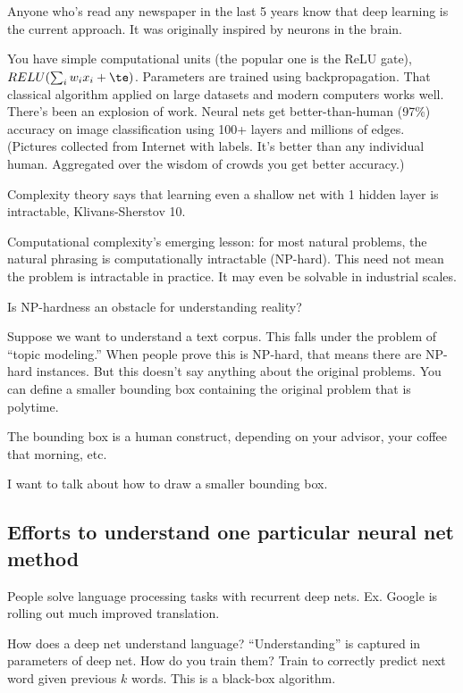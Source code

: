 Anyone who's read any newspaper in the last 5 years know that deep learning is the current approach. It was originally inspired by neurons in the brain.

You have simple computational units (the popular one is the ReLU gate), $RELU(\sum_i w_i x_i+\te)$.  
Parameters are trained using backpropagation. That classical algorithm applied on large datasets and modern computers works well. There's been an explosion of work. Neural nets get better-than-human (97\%) accuracy on image classification using 100+ layers and millions of edges. (Pictures collected from Internet with labels. It's better than any individual human. Aggregated over the wisdom of crowds you get better accuracy.)


Complexity theory says that learning even a shallow net with 1 hidden layer is intractable, Klivans-Sherstov 10.


Computational complexity's emerging lesson: for most natural problems, the natural phrasing is computationally intractable (NP-hard).
This need not mean the problem is intractable in practice. It may even be solvable in industrial scales.

Is NP-hardness an obstacle for understanding reality? 

Suppose we want to understand a text corpus. This falls under the problem of ``topic modeling.'' When people prove this is NP-hard, that means there are NP-hard instances. But this doesn't say anything about the original problems. You can define a smaller bounding box containing the original problem that is polytime.

The bounding box is a human construct, depending on your advisor, your coffee that morning, etc. 

I want to talk about how to draw a smaller bounding box. 

\subsection{Efforts to understand one particular neural net method}

People solve language processing tasks with recurrent deep nets. Ex. 
Google is rolling out much improved translation.

How does a deep net understand language?
``Understanding'' is captured in parameters of deep net. How do you train them? Train to correctly predict next word given previous $k$ words. This is a black-box algorithm.

